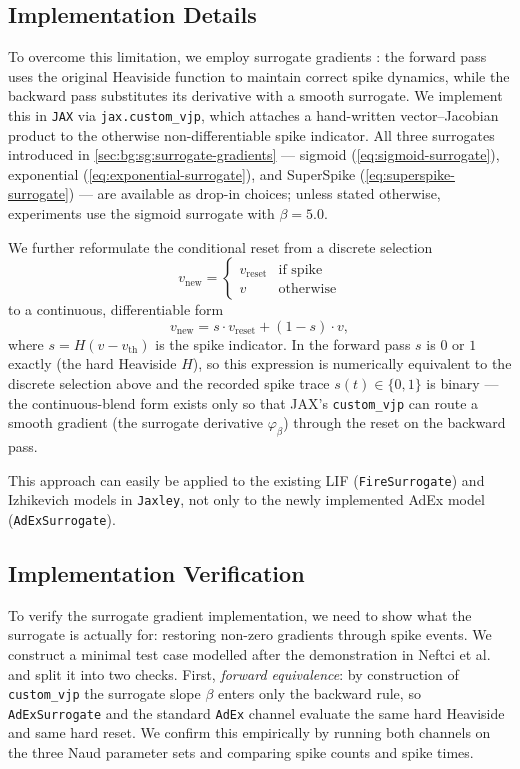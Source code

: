 \subsection{Implementation Details}\label{sec:method:surrogate-gradients:implementation}
To overcome this limitation, we employ surrogate gradients \cite{Neftci2019}: the forward pass uses the original Heaviside function to maintain correct spike dynamics, while the backward pass substitutes its derivative with a smooth surrogate.
We implement this in \texttt{JAX} via \texttt{jax.custom\_vjp}, which attaches a hand-written vector--Jacobian product to the otherwise non-differentiable spike indicator.
All three surrogates introduced in \cref{sec:bg:sg:surrogate-gradients} --- sigmoid (\cref{eq:sigmoid-surrogate}), exponential (\cref{eq:exponential-surrogate}), and SuperSpike (\cref{eq:superspike-surrogate}) --- are available as drop-in choices; unless stated otherwise, experiments use the sigmoid surrogate with $\beta = 5.0$.

We further reformulate the conditional reset from a discrete selection
\begin{equation}
    v_{\text{new}} = \begin{cases} v_{\text{reset}} & \text{if spike} \\ v & \text{otherwise} \end{cases}
\end{equation}
to a continuous, differentiable form
\begin{equation}
    v_{\text{new}} = s \cdot v_{\text{reset}} + (1 - s) \cdot v,
\end{equation}
where $s = H(v - v_{\text{th}})$ is the spike indicator.
In the forward pass $s$ is $0$ or $1$ exactly (the hard Heaviside $H$), so this expression is numerically equivalent to the discrete selection above and the recorded spike trace $s(t)\in\{0,1\}$ is binary --- the continuous-blend form exists only so that JAX's \texttt{custom\_vjp} can route a smooth gradient (the surrogate derivative $\varphi_\beta$) through the reset on the backward pass.

This approach can easily be applied to the existing \gls{LIF} (\texttt{Fire\-Surrogate}) and Izhikevich models in \texttt{Jax\-ley},
not only to the newly implemented \gls{AdEx} model (\texttt{AdEx\-Surro\-gate}).

\subsection{Implementation Verification}\label{sec:method:surrogate-gradients:verification}
To verify the surrogate gradient implementation, we need to show what the surrogate is actually for: restoring non-zero gradients through spike events.
We construct a minimal test case modelled after the demonstration in Neftci et al.~\cite{Neftci2019} and split it into two checks.
First, \emph{forward equivalence}: by construction of \texttt{custom\_vjp} the surrogate slope $\beta$ enters only the backward rule, so \texttt{AdExSurrogate} and the standard \texttt{AdEx} channel evaluate the same hard Heaviside and same hard reset.
We confirm this empirically by running both channels on the three Naud parameter sets and comparing spike counts and spike times.

